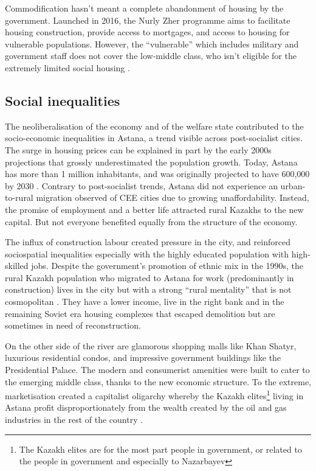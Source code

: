 \documentclass{article}
\begin{document}
Commodification hasn't meant a complete abandonment of housing by the government. Launched in 2016, the Nurly Zher programme aims to facilitate housing construction, provide access to mortgages, and access to housing for vulnerable populations. However, the ``vulnerable'' which includes military and government staff does not cover the low-middle class, who isn't eligible for the extremely limited social housing \parencite{unece2018housing}.

\subsection{Social inequalities}

The neoliberalisation of the economy and of the welfare state contributed to the socio-economic inequalities in Astana, a trend visible across post-socialist cities. The surge in housing prices can be explained in part by the early 2000s projections that grossly underestimated the population growth. Today, Astana has more than 1 million inhabitants, and was originally projected to have 600,000 by 2030 \parencite{masterplan2001}. Contrary to post-socialist trends, Astana did not experience an urban-to-rural migration observed of CEE cities due to growing unaffordability. Instead, the promise of employment and a better life attracted rural Kazakhs to the new capital. But not everyone benefited equally from the structure of the economy.

The influx of construction labour created pressure in the city, and reinforced sociospatial inequalities especially with the highly educated population with high-skilled jobs.
Despite the government's promotion of ethnic mix in the 1990s, the rural Kazakh population who migrated to Astana for work (predominantly in construction) lives in the city but with a strong ``rural mentality'' that is not cosmopolitan \parencite{koch2014bordering}. They have a lower income, live in the right bank and in the remaining Soviet era housing complexes that escaped demolition but are sometimes in need of reconstruction.

On the other side of the river are glamorous shopping malls like Khan Shatyr, luxurious residential condos, and impressive government buildings like the Presidential Palace. The modern and consumerist amenities were built to cater to the emerging middle class, thanks to the new economic structure. To the extreme, marketisation created a capitalist oligarchy whereby the Kazakh elites\footnote{The Kazakh elites are for the most part people in government, or related to the people in government and especially to Nazarbayev} living in Astana profit disproportionately from the wealth created by the oil and gas industries in the rest of the country \parencite{gallo2021three}.
\end{document}
